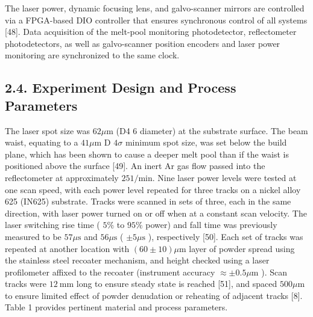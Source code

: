 \documentclass[10pt]{article}
\begin{document}
The laser power, dynamic focusing lens, and galvo-scanner mirrors are controlled via a FPGA-based DIO controller that ensures synchronous control of all systems [48]. Data acquisition of the melt-pool monitoring photodetector, reflectometer photodetectors, as well as galvo-scanner position encoders and laser power monitoring are synchronized to the same clock.

\subsection*{2.4. Experiment Design and Process Parameters}
The laser spot size was $62 \mu \mathrm{m}$ (D4 6 diameter) at the substrate surface. The beam waist, equating to a $41 \mu \mathrm{m}$ D $4 \sigma$ minimum spot size, was set below the build plane, which has been shown to cause a deeper melt pool than if the waist is positioned above the surface [49]. An inert Ar gas flow passed into the reflectometer at approximately $251 / \mathrm{min}$. Nine laser power levels were tested at one scan speed, with each power level repeated for three tracks on a nickel alloy 625 (IN625) substrate. Tracks were scanned in sets of three, each in the same direction, with laser power turned on or off when at a constant scan velocity. The laser switching rise time ( $5 \%$ to $95 \%$ power) and fall time was previously measured to be $57 \mu \mathrm{s}$ and $56 \mu \mathrm{s}$ ( $\pm 5 \mu \mathrm{s}$ ), respectively [50]. Each set of tracks was repeated at another location with $(60 \pm 10) \mu \mathrm{m}$ layer of powder spread using the stainless steel recoater mechanism, and height checked using a laser profilometer affixed to the recoater (instrument accuracy $\approx \pm 0.5 \mu \mathrm{m}$ ). Scan tracks were $12 \mathrm{~mm}$ long to ensure steady state is reached [51], and spaced $500 \mu \mathrm{m}$ to ensure limited effect of powder denudation or reheating of adjacent tracks [8]. Table 1 provides pertinent material and process parameters.
\end{document}

